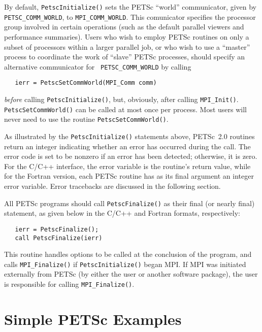 By default, {\tt PetscInitialize()} sets the PETSc ``world''
communicator, given by {\tt PETSC\_COMM\_WORLD}, to {\tt MPI\_COMM\_WORLD}.
This comunicator specifies the processor group involved in certain
operations (such as the default parallel viewers and performance
summaries).  Users who wish to employ PETSc routines on only a subset
of processors within a larger parallel job, or who wish to use a
``master'' process to coordinate the work of ``slave'' PETSc
processes, should specify an alternative communicator for {\tt
PETSC\_COMM\_WORLD} by calling 
\begin{verbatim}
   ierr = PetscSetCommWorld(MPI_Comm comm)
\end{verbatim}
{\em before} calling {\tt PetscInitialize()}, but, obviously, after
calling {\tt MPI\_Init()}. {\tt PetscSetCommWorld()} can be called
at most once per process. Most users will never need to use the routine
{\tt PetscSetCommWorld()}.

As illustrated by the {\tt PetscInitialize()} statements above,
PETSc~2.0 routines return an integer indicating whether an error has
occurred during the call.  The error code is set to be nonzero if an
error has been detected; otherwise, it is zero.  For the C/C++
interface, the error variable is the routine's return value, while for
the Fortran version, each PETSc routine has as its final argument an
integer error variable.  Error tracebacks are discussed in the following
section.

All PETSc programs should call {\tt PetscFinalize()} 
as their final (or nearly final) statement, as given below in the C/C++
and Fortran formats, respectively:
\begin{verbatim}
   ierr = PetscFinalize();
   call PetscFinalize(ierr)
\end{verbatim}
This routine handles options to be called at the conclusion of
the program, and calls {\tt MPI\_Finalize()} 
if {\tt PetscInitialize()}
began MPI. If MPI was initiated externally from PETSc (by either
the user or another software package), the user is
responsible for calling {\tt MPI\_Finalize()}. 

\section{Simple PETSc Examples}

\label{sec:simple}

